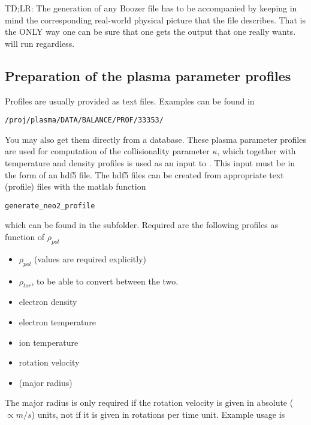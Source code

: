 \documentclass{article}
\newcommand{\vv}[1]{\texttt{\detokenize{#1}}}
\begin{document}
TD;LR: The generation of any Boozer file has to be accompanied by keeping in mind the 
corresponding real-world physical picture that the file describes. That is the ONLY way one can be
sure that one gets the output that one really wants. \vv{NEO-2} will run regardless.

\subsection{Preparation of the plasma parameter profiles\label{running_preparation_profiles}}
Profiles are usually provided as text files. Examples can be found in
\begin{verbatim}
/proj/plasma/DATA/BALANCE/PROF/33353/
\end{verbatim}
You may also get them directly from a database.
These
plasma parameter profiles are used for computation of the collisionality
parameter $\kappa$, which together with temperature and density profiles
is used as an input to \vv{NEO-2-QL}.
This input must be in the form of an hdf5 file.
The hdf5 files can be created from appropriate text (profile) files with the
matlab function
\begin{verbatim}
generate_neo2_profile
\end{verbatim}
which can be found in the \vv{OctaveScripts} subfolder.
Required are the following profiles as function of $\rho_{pol}$
\begin{itemize}
  \item $\rho_{pol}$ (values are required explicitly)
  \item $\rho_{tor}$, to be able to convert between the two.
  \item electron density
  \item electron temperature
  \item ion temperature
  \item rotation velocity
  \item (major radius)
\end{itemize}
The major radius is only required if the rotation velocity is given in
absolute ($\propto m/s$) units, not if it is given in rotations per time
unit.
Example usage is
\end{document}
